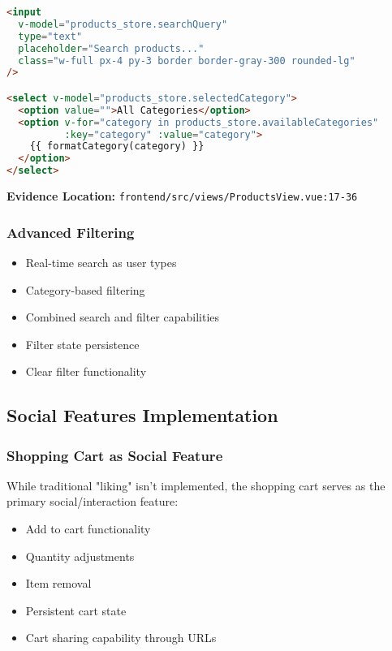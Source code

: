 \documentclass[12pt,a4paper]{article}
\begin{document}
\begin{lstlisting}[language=html, caption=Search Interface]
<input
  v-model="products_store.searchQuery"
  type="text"
  placeholder="Search products..."
  class="w-full px-4 py-3 border border-gray-300 rounded-lg"
/>

<select v-model="products_store.selectedCategory">
  <option value="">All Categories</option>
  <option v-for="category in products_store.availableCategories" 
          :key="category" :value="category">
    {{ formatCategory(category) }}
  </option>
</select>
\end{lstlisting}

\textbf{Evidence Location:} \texttt{frontend/src/views/ProductsView.vue:17-36}

\subsubsection{Advanced Filtering}
\begin{itemize}
    \item Real-time search as user types
    \item Category-based filtering
    \item Combined search and filter capabilities
    \item Filter state persistence
    \item Clear filter functionality
\end{itemize}

\subsection{Social Features Implementation}

\subsubsection{Shopping Cart as Social Feature}
While traditional "liking" isn't implemented, the shopping cart serves as the primary social/interaction feature:

\begin{itemize}
    \item Add to cart functionality
    \item Quantity adjustments
    \item Item removal
    \item Persistent cart state
    \item Cart sharing capability through URLs
\end{itemize}
\end{document}
